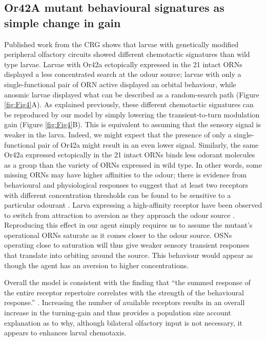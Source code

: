 \documentclass[10pt,a4paper]{article}
\begin{document}
\subsection{Or42A mutant behavioural signatures as simple change in gain}
Published work from the CRG shows that larvae with genetically modified peripheral olfactory circuits showed different chemotactic signatures than wild type larvae. Larvae with Or42a ectopically expressed in the 21 intact ORNs displayed a less concentrated search at the odour source; larvae with only a single-functional pair of ORN active displayed an orbital behaviour, while anosmic larvae displayed what can be described as a random-search path (Figure \ref{fig:Fig4}A).
 As explained previously, these different chemotactic signatures can be reproduced by our model by simply lowering the transient-to-turn modulation gain (Figure \ref{fig:Fig4}B). This is equivalent to assuming that the sensory signal is weaker in the larva. Indeed, we might expect that the presence of only a single-functional pair of Or42a might result in an even lower signal.
 Similarly, the same Or42a expressed ectopically in the 21 intact ORNs binds less odorant molecules as a group than the variety of ORNs expressed in wild type. In other words, some missing ORNs may have higher affinities to the odour; there is evidence from behavioural and physiological responses to suggest that at least two receptors with different concentration thresholds can be found to be sensitive to a particular odourant \citep{kreher2008translation}. 
 Larva expressing a high-affinity receptor have been observed to switch from attraction to aversion as they approach the odour source \citep{gomez2011active, kreher2008translation}. Reproducing this effect in our agent simply requires us to assume the mutant's operational ORNs saturate as it comes closer to the odour source. OSNs operating close to saturation will thus give weaker sensory transient responses that translate into orbiting around the source. This behaviour would appear as though the agent has an aversion to higher concentrations.
 
 Overall the model is consistent with the finding that ``the summed response of the entire receptor repertoire correlates with the strength of the behavioural response.” \citep{kreher2008translation}. Increasing the number of available receptors results in an overall increase in the turning-gain and thus provides a population size account explanation as to why, although bilateral olfactory input is not necessary, it appears to enhances larval chemotaxis.
\end{document}
